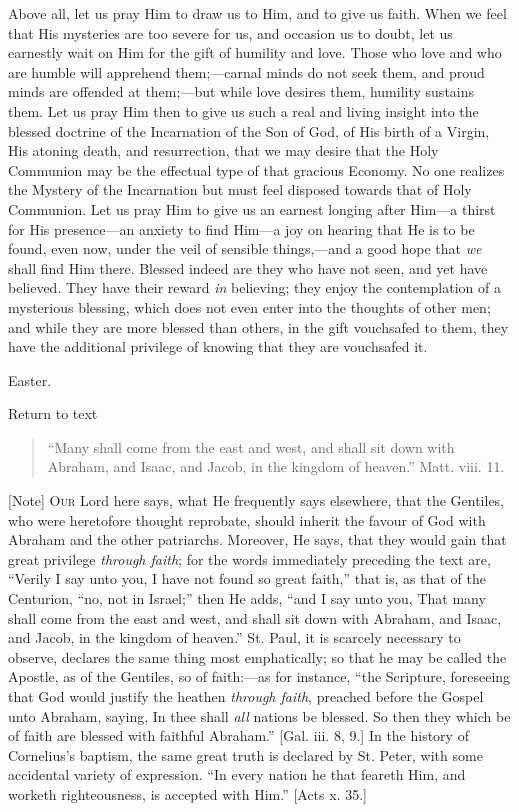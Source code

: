 Above all, let us pray Him to draw us to Him, and to give us faith.
When we feel that His mysteries are too severe for us, and occasion us
to doubt, let us earnestly wait on Him for the gift of humility and
love. Those who love and who are humble will apprehend them;—carnal
minds do not seek them, and proud minds are offended at them;—but
while love desires them, humility sustains them. Let us pray Him then
to give us such a real and living insight into the blessed doctrine of
the Incarnation of the Son of God, of His birth of a Virgin, His
atoning death, and resurrection, that we may desire that the Holy
Communion may be the effectual type of that gracious Economy. No one
realizes the Mystery of the Incarnation but must feel disposed towards
that of Holy Communion. Let us pray Him to give us an earnest longing
after Him—a thirst for His presence—an anxiety to find Him—a joy
on hearing that He is to be found, even now, under the veil of
sensible things,—and a good hope that \emph{we} shall find Him
there. Blessed indeed are they who have not seen, and yet have
believed. They have their reward \emph{in} believing; they enjoy the
contemplation of a mysterious blessing, which does not even enter into
the thoughts of other men; and while they are more blessed than
others, in the gift vouchsafed to them, they have the additional
privilege of knowing that they are vouchsafed it.


Easter.

Return to text


\begin{quote}

``Many shall come from the east and west, and shall sit down
with Abraham, and Isaac, and Jacob, in the kingdom of heaven.''
Matt. viii. 11.

\end{quote}

[Note] O\textsc{ur} Lord here says, what
He frequently says elsewhere, that the Gentiles, who were heretofore
thought reprobate, should inherit the favour of God with Abraham and
the other patriarchs. Moreover, He says, that they would gain that
great privilege \emph{through faith}; for the words immediately
preceding the text are, ``Verily I say unto you, I have not found
so great faith,'' that is, as that of the Centurion, ``no, not
in Israel;'' then He adds, ``and I say unto you, That many
shall come from the east and west, and shall sit down with Abraham,
and Isaac, and Jacob, in the kingdom of heaven.'' St. Paul, it is
scarcely necessary to observe, declares the same thing most
emphatically; so that he may be called the Apostle, as of the
Gentiles, so of faith:—as for instance, ``the Scripture,
foreseeing that God would justify the heathen \emph{through faith},
preached before the Gospel unto Abraham, saying, In thee shall \emph{all}
nations be blessed. So then they which be of faith are blessed with
faithful Abraham.'' [Gal. iii. 8, 9.] In the history of Cornelius's
baptism, the same great truth is declared by St. Peter, with some
accidental variety of expression. ``In every nation he that
feareth Him, and worketh righteousness, is accepted with Him.''
[Acts x. 35.]


